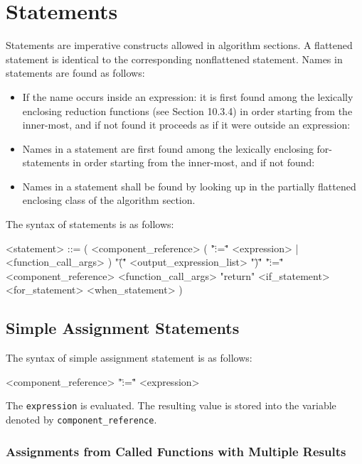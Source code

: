 \documentclass[11pt,a4paper,notitlepage]{report}
\begin{document}

\section{Statements}

Statements are imperative constructs allowed in algorithm sections. A flattened statement is identical to the
corresponding nonflattened statement.
Names in statements are found as follows:
\begin{itemize}
\item If the name occurs inside an expression: it is first found among the lexically enclosing reduction functions
(see Section 10.3.4) in order starting from the inner-most, and if not found it proceeds as if it were outside
an expression: 
\item Names in a statement are first found among the lexically enclosing for-statements in order starting from the
inner-most, and if not found: 
\item Names in a statement shall be found by looking up in the partially flattened enclosing class of the algorithm
section.  
\end{itemize}
The syntax of statements is as follows:
\begin{grammar}

<statement> ::=
( <component_reference> ( "\":=\"" <expression> | <function_call_args> )
\alt "\"(\"" <output_expression_list> "\")\"" "\":=\"" <component_reference> <function_call_args>
\alt "return"
\alt <if_statement>
\alt <for_statement>
\alt <when_statement> )

\end{grammar}

\subsection{Simple Assignment Statements}
The syntax of simple assignment statement is as follows:
\begin{grammar}
<component_reference> "\":=\"" <expression>
\end{grammar}
The \verb"expression" is evaluated. The resulting value is stored into the variable denoted by \verb"component_reference".

\subsubsection{Assignments from Called Functions with Multiple Results}
\end{document}
